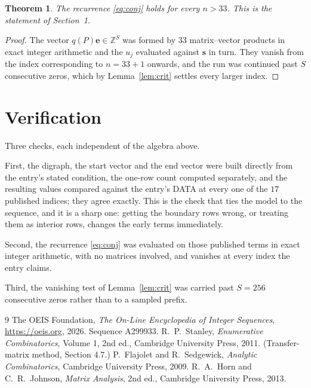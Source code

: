 \documentclass[11pt,a4paper]{article}
\theoremstyle{plain}
\newtheorem{theorem}{Theorem}
\theoremstyle{definition}
\begin{document}
\begin{theorem}
The recurrence \eqref{eq:conj} holds for every $n>33$. This is the statement of
Section~1.
\end{theorem}

\begin{proof}
The vector $q(P)\mathbf{e}\in\mathbb{Z}^{S}$ was formed by $33$ matrix--vector
products in exact integer arithmetic and the $u_j$ evaluated against $\mathbf{s}$ in turn.
They vanish from the index corresponding to $n=33+1$ onwards, and the run was continued
past $S$ consecutive zeros, which by Lemma~\ref{lem:crit} settles every larger index.
\end{proof}

\section{Verification}

Three checks, each independent of the algebra above.

First, the digraph, the start vector and the end vector were built directly from the
entry's stated condition, the one-row count computed separately, and the resulting values
compared against the entry's DATA at every one of the $17$ published indices; they
agree exactly. This is the check that ties the model to the sequence, and it is a sharp one:
getting the boundary rows wrong, or treating them as interior rows, changes the early terms
immediately.

Second, the recurrence \eqref{eq:conj} was evaluated on those published terms in exact
integer arithmetic, with no matrices involved, and vanishes at every index the entry claims.

Third, the vanishing test of Lemma~\ref{lem:crit} was carried past $S=256$ consecutive
zeros rather than to a sampled prefix.

\begin{thebibliography}{9}
 The OEIS Foundation, \emph{The On-Line Encyclopedia of Integer
Sequences}, \url{https://oeis.org}, 2026. Sequence A299933.
 R.~P.~Stanley, \emph{Enumerative Combinatorics}, Volume 1, 2nd ed.,
Cambridge University Press, 2011. (Transfer-matrix method, Section 4.7.)
 P.~Flajolet and R.~Sedgewick, \emph{Analytic Combinatorics}, Cambridge
University Press, 2009.
 R.~A.~Horn and C.~R.~Johnson, \emph{Matrix Analysis}, 2nd ed., Cambridge
University Press, 2013.
\end{thebibliography}
\end{document}
